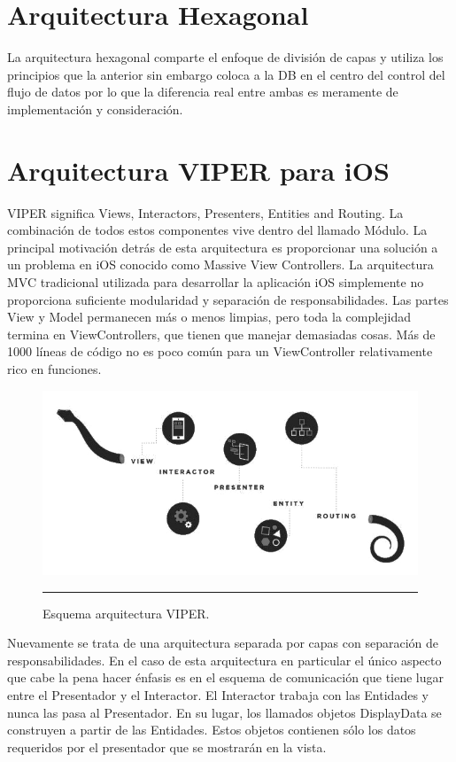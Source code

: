 \section{Arquitectura Hexagonal}
La arquitectura hexagonal comparte el enfoque de división de capas y utiliza los principios que la anterior sin embargo coloca a la DB en el centro del control del flujo de datos por lo que la diferencia real entre ambas es meramente de implementación y consideración.

\section{Arquitectura VIPER para iOS}
VIPER significa Views, Interactors, Presenters, Entities and Routing. La combinación de todos estos componentes vive dentro del llamado Módulo. La principal motivación detrás de esta arquitectura es proporcionar una solución a un problema en iOS conocido como Massive View Controllers. La arquitectura MVC tradicional utilizada para desarrollar la aplicación iOS simplemente no proporciona suficiente modularidad y separación de responsabilidades. Las partes View y Model permanecen más o menos limpias, pero toda la complejidad termina en ViewControllers, que tienen que manejar demasiadas cosas. Más de 1000 líneas de código no es poco común para un ViewController relativamente rico en funciones.

\begin{figure}[htbp]
	\centering
	\includegraphics[width=1\textwidth]{Figures/-005_bw.png}
	\rule{35em}{1pt}
	\caption[VIPER Arch]{Esquema arquitectura VIPER.}
	\label{fig:C2S3_VA_01}
\end{figure}

Nuevamente se trata de una arquitectura separada por capas con separación de responsabilidades. En el caso de esta arquitectura en particular el único aspecto que cabe la pena hacer énfasis es en el esquema de comunicación que tiene lugar entre el Presentador y el Interactor. El Interactor trabaja con las Entidades y nunca las pasa al Presentador. En su lugar, los llamados objetos DisplayData se construyen a partir de las Entidades. Estos objetos contienen sólo los datos requeridos por el presentador que se mostrarán en la vista.

